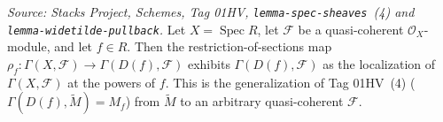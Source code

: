 \begin{lemma}\leanok
  \label{lem:qcoh_section_isLocalizedModule}
  \textit{Source: Stacks Project, Schemes, Tag 01HV, \texttt{lemma-spec-sheaves}~(4) and
  \texttt{lemma-widetilde-pullback}.}
  Let \(X = \operatorname{Spec} R\), let \(\mathcal{F}\) be a quasi-coherent
  \(\mathcal{O}_X\)-module, and let \(f \in R\). Then the restriction-of-sections map
  \(\rho_f : \Gamma(X, \mathcal{F}) \to \Gamma(D(f), \mathcal{F})\) exhibits
  \(\Gamma(D(f), \mathcal{F})\) as the localization of \(\Gamma(X, \mathcal{F})\) at the powers of
  \(f\). This is the
  generalization of Tag 01HV~(4) (\(\Gamma(D(f), \widetilde{M}) = M_f\)) from \(\widetilde{M}\) to an
  arbitrary quasi-coherent \(\mathcal{F}\).
\end{lemma}
